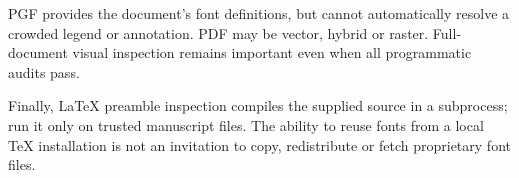\documentclass[10pt,twocolumn,a4paper]{article}
\begin{document}
PGF provides the document's font definitions,
but cannot automatically resolve a crowded
legend or annotation. PDF may be vector,
hybrid or raster. Full-document visual
inspection remains important even when all
programmatic audits pass.

Finally, LaTeX preamble inspection compiles
the supplied source in a subprocess; run it
only on trusted manuscript files. The
ability to reuse fonts from a local TeX
installation is not an invitation to copy,
redistribute or fetch proprietary font files.
\end{document}
